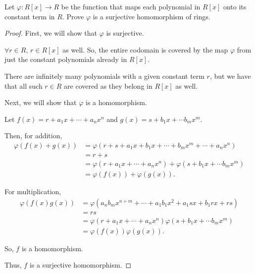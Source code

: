 \documentclass[../hw4]{subfiles}
\begin{document}
\begin{problem}
Let $\varphi:R[x]\to R$ be the function that maps each polynomial in $R[x]$ onto its constant term in $R$.
Prove  $\varphi$ is a surjective homomorphism of rings.
\end{problem}
\begin{proof}
	First, we will show that $\varphi$ is surjective.

	$\forall r\in R,\, r\in R[x]$ as well. So, the entire codomain is covered by the map $\varphi$ from just the constant polynomials already in  $R[x]$.

	There are infinitely many polynomials with a given constant term  $r$,
	but we have that all such  $r\in R$ are covered as they belong in $R[x]$ as well.

	Next, we will show that  $\varphi$ is a homomorphism.

	Let  $f(x)=r+a_1x+\cdots+a_n x^n$ and $g(x)=s+b_1x+\cdots b_mx^m$.

	Then, for addition,
	\begin{align*}
		\varphi(f(x)+g(x)) & = \varphi(r + s + a_1 x + b_1 x + \cdots + b_m x^m + \cdots + a_n x^n) \\
		                   & = r+s                                                                  \\
		                   & = \varphi(r+a_1x+\cdots+a_n x^n)+\varphi(s+b_1x+\cdots b_mx^m)         \\
		                   & = \varphi(f(x))+\varphi(g(x))
		.\end{align*}

	For multiplication,
	\begin{align*}
		\varphi(f(x)g(x)) & = \varphi(a_n b_m x^{n+m}+ \cdots + a_1 b_1 x^2 + a_1 s x + b_1 r x + rs) \\
		                  & = rs                                                                      \\
		                  & = \varphi(r+a_1x+\cdots+a_n x^n)\varphi(s+b_1x+\cdots b_mx^m)             \\
		                  & = \varphi(f(x))\varphi(g(x))
		.\end{align*}

	So, $f$ is a homomorphism.

	Thus,  $f$ is a surjective homomorphism.
\end{proof}
\end{document}
